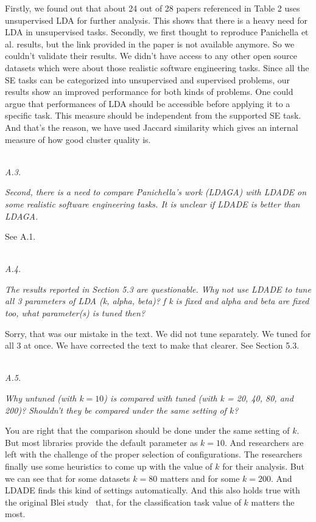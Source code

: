 \documentclass[conference]{IEEEtran}
\begin{document}
Firstly, we found out that about 24 out of 28 papers referenced in Table 2 uses unsupervised LDA for further analysis. This shows that there is a heavy need for LDA in unsupervised tasks. Secondly, we first thought to reproduce Panichella et al. results, but the link provided in the paper is not available anymore. So we couldn't validate their results. We didn't have access to any other open source datasets which were about those realistic software engineering tasks. Since all the SE tasks can be categorized into unsupervised and supervised problems, our results show an improved performance for both kinds of problems. One could argue that performances of LDA should be accessible before applying it to a specific task. This measure should be independent from the supported SE task. And that's the reason, we have used Jaccard similarity which gives an internal measure of how good cluster quality is.

\noindent
\textit{\\A.3.} 

\textit{Second, there is a need to compare Panichella's work (LDAGA) with LDADE on some realistic software engineering tasks. It is unclear if LDADE is better than LDAGA.\\}

See A.1.

\noindent
\textit{\\A.4.}

\textit{The results reported in Section 5.3 are questionable. Why not use LDADE to tune all 3 parameters of LDA (k, alpha, beta)? f k is fixed and alpha and beta are fixed too, what parameter(s) is tuned then?\\}

 Sorry, that was our mistake in the text. We did not tune separately. We tuned for all 3 at once. We have corrected the text to make that clearer. See Section 5.3.

\noindent
\textit{\\A.5.}  

\textit{Why untuned (with $k = 10$) is compared with tuned (with k = 20, 40, 80, and 200)? Shouldn't they be compared under the same setting of $k$? \\}

You are right that the comparison should be done under the same setting of $k$. But most libraries provide the default parameter as $k=10$. And researchers are left with the challenge of the proper selection of configurations. The researchers finally use some heuristics to come up with the value of $k$ for their analysis. But we can see that for some datasets $k=80$ matters and for some $k=200$. And LDADE finds this kind of settings automatically. And this also holds true with the original Blei study~\cite{blei2003latent} that, for the classification task value of $k$ matters the most.
\end{document}
